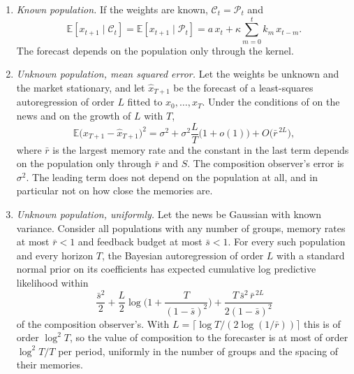 \begin{theorem}\label{n:irr}
\begin{enumerate}[label=(\roman*),itemsep=1pt]
\item \emph{Known population.} If the weights are known, $\mathcal C_t=\mathcal P_t$ and
\[
\mathbb E[x_{t+1}\mid\mathcal C_t]=\mathbb E[x_{t+1}\mid\mathcal P_t]=a\,x_t+\kappa\sum_{m=0}^{t}k_m\,x_{t-m}.
\]
The forecast depends on the population only through the kernel.
\item \emph{Unknown population, mean squared error.} Let the weights be unknown and the market stationary, and let $\hat x_{T+1}$ be the forecast of a least-squares autoregression of order $L$ fitted to $x_0,\ldots,x_T$. Under the conditions of \citet{ingwei2003} on the news and on the growth of $L$ with $T$,
\[
\mathbb E\big(x_{T+1}-\hat x_{T+1}\big)^2=\sigma^2+\sigma^2\frac{L}{T}\big(1+o(1)\big)+O\big(\bar r^{\,2L}\big),
\]
where $\bar r$ is the largest memory rate and the constant in the last term depends on the population only through $\bar r$ and $S$. The composition observer's error is $\sigma^2$. The leading term does not depend on the population at all, and in particular not on how close the memories are.
\item \emph{Unknown population, uniformly.} Let the news be Gaussian with known variance. Consider all populations with any number of groups, memory rates at most $\bar r<1$ and feedback budget at most $\bar s<1$. For every such population and every horizon $T$, the Bayesian autoregression of order $L$ with a standard normal prior on its coefficients has expected cumulative log predictive likelihood within
\[
\frac{\bar s^2}{2}+\frac L2\log\Big(1+\frac{T}{(1-\bar s)^2}\Big)+\frac{T\,\bar s^2\,\bar r^{\,2L}}{2(1-\bar s)^2}
\]
of the composition observer's. With $L=\lceil\log T/(2\log(1/\bar r))\rceil$ this is of order $\log^2T$, so the value of composition to the forecaster is at most of order $\log^2T/T$ per period, uniformly in the number of groups and the spacing of their memories.
\end{enumerate}
\end{theorem}

